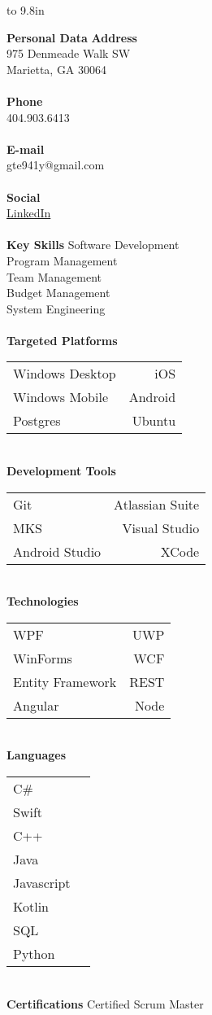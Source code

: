 \documentclass[paper=a4,fontsize=11pt]{article}
\newcommand{\filledmarker}{\raisebox{0.5pt}{\tikz{\node[draw,scale=0.6,circle,fill=black](){};}}}
\newcommand{\unfilledmarker}{\raisebox{0.5pt}{\tikz{\node[draw,scale=0.6,circle,fill=none](){};}}}
\newcommand{\beginnerscale}{
	\filledmarker\hspace{.1mm}
	\unfilledmarker\hspace{.1mm}
	\unfilledmarker\hspace{.1mm}
	\unfilledmarker\hspace{.1mm}
	\unfilledmarker
}
\newcommand{\beginnerprofscale}{
	\filledmarker\hspace{.1mm}
	\filledmarker\hspace{.1mm}
	\unfilledmarker\hspace{.1mm}
	\unfilledmarker\hspace{.1mm}
	\unfilledmarker
}
\newcommand{\proficientscale}{
	\filledmarker\hspace{.1mm}
	\filledmarker\hspace{.1mm}
	\filledmarker\hspace{.1mm}
	\unfilledmarker\hspace{.1mm}
	\unfilledmarker
}
\newcommand{\profexpertscale}{
	\filledmarker\hspace{.1mm}
	\filledmarker\hspace{.1mm}
	\filledmarker\hspace{.1mm}
	\filledmarker\hspace{.1mm}
	\unfilledmarker
}
\newcommand{\expertscale}{
	\filledmarker\hspace{.1mm}
	\filledmarker\hspace{.1mm}
	\filledmarker\hspace{.1mm}
	\filledmarker\hspace{.1mm}
	\filledmarker
}
\newcommand{\PersonalData}[4]{
	\textbf{Personal Data}
	\myrule[1pt][5pt]
	\textbf{Address}\\
	#1\\
	#2\\
	\\[1pt]
	\textbf{Phone}\\
	#3\\
	\\[1pt]
	\textbf{E-mail}\\
	#4\\
	\\[1pt]
	\textbf{Social}\\
	\href{https://www.linkedin.com/in/justinrfox}{LinkedIn}\\
	\\[6pt]
}
\newcommand{\KeySkills}[5]{
	\textbf{Key Skills}
	\myrule[1pt][5pt]
	\small #1\\
	\small #2\\
	\small #3\\
	\small #4\\
	\small #5\\
	\\[6pt]
}
\newcommand{\Platforms}[6]{
	\textbf{Targeted Platforms}
	\myrule[1pt][5pt]
	\begin{tabular}{ l r }
	\small #1 &
	\small #2\\
	\small #3 &
	\small #4\\
	\small #5 &
	\small #6\\
	\end{tabular}
	\\[6pt]
}
\newcommand{\TechnicalSkills}[8]{
	\textbf{Technologies}
	\myrule[1pt][5pt]
	\begin{tabular}{ l r }
  		\small #1 & \small #2 \\
 		\small #3 & \small #4 \\
  		\small #5 & \small #6 \\
		\small #7 & \small #8 \\
	\end{tabular}
	\\[6pt]
}
\newcommand{\Languages}[1]{
	\textbf{Languages}
	\myrule[1pt][5pt]
	\begin{tabular}{ l r }
	\small C\# &
	\small \expertscale\\
	\small Swift &
	\small \profexpertscale\\
	\small C++ &
	\small \proficientscale\\
	\small Java &
	\small \proficientscale\\
	\small Javascript &
	\small \proficientscale\\
	\small Kotlin &
	\small \beginnerprofscale\\
	\small SQL &
	\small \beginnerprofscale\\
	\small Python &
	\small \beginnerscale\\
	\end{tabular}
	\\[6pt]
}
\newcommand{\DeveloperTools}[6]{
	\textbf{Development Tools}
	\myrule[1pt][5pt]
	\begin{tabular}{ l r }
	\small #1 &
	\small #2\\
	\small #3 &
	\small #4\\
	\small #5 &
	\small #6\\
	\end{tabular}
	\\[6pt]
}
\newcommand{\Certifications}[1]{
	\textbf{Certifications}
	\myrule[1pt][5pt]
	#1
	\\[6pt]
}
\begin{document}
\hfill
\begin{minipage}[t]{0.25\linewidth}
	\colorbox{myLightGray}{
	\vbox to 9.8in{
			\PersonalData{975 Denmeade Walk SW}{Marietta, GA 30064}{404.903.6413}{gte941y@gmail.com}
			\KeySkills{Software Development}{Program Management}{Team Management}{Budget Management}{System Engineering}
			\Platforms{Windows Desktop}{iOS}{Windows Mobile}{Android}{Postgres}{Ubuntu}
			\DeveloperTools{Git}{Atlassian Suite}{MKS}{Visual Studio}{Android Studio}{XCode}
			\TechnicalSkills{WPF}{UWP}{WinForms}{WCF}{Entity Framework}{REST}{Angular}{Node}
			\Languages{}
			\Certifications{Certified Scrum Master}
			\vfill
		}
	}
\end{minipage}%
\end{document}

